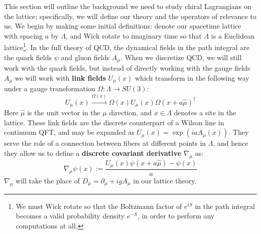 \documentclass[11pt, oneside]{article}   	%
\theoremstyle{definition}
\begin{document}
This section will outline the background we need to study chiral Lagrangians on the lattice; specifically, we will define our 
theory and the operators of relevance to us. We begin by making some initial definitions: denote our spacetime lattice with 
spacing $a$ by $\Lambda$, and Wick rotate to imaginary time so that $\Lambda$ is a Euclidean lattice\footnote{We must 
Wick rotate so that the Boltzmann factor of $e^{iS}$ in the path integral becomes a valid probability density $e^{-S}$, in 
order to perform any computations at all.}. In the full theory of QCD, the dynamical fields in the path integral are the quark 
fields $\psi$ and gluon fields $A_\mu$. When we discretize QCD, we will still work with the quark fields, but instead of 
directly working with the gauge fields $A_\mu$ we will work with \textbf{link fields} $U_\mu(x)$ which transform in the 
following way under a gauge transformation $\Omega : \Lambda\rightarrow SU(3)$:
\begin{equation}
	U_\mu(x)\xrightarrow{\Omega(x)}\Omega(x) U_\mu(x)\Omega(x + a\hat{\mu})^\dagger
\end{equation}
Here $\hat{\mu}$ is the unit vector in the $\mu$ direction, and $x\in\Lambda$ denotes a site in the lattice. These link fields 
are the discrete counterpart of a Wilson line in continuum QFT, and may be expanded as $U_\mu(x) = \exp(ia A_\mu(x))$. 
They serve the role of a connection between fibers at different points in $\Lambda$, and hence they allow us to define a 
\textbf{discrete covariant derivative} $\nabla_\mu$ as:
\begin{equation}
	\nabla_\mu\psi(x) := \frac{U_\mu(x)\psi(x + a\hat{\mu}) - \psi(x)}{a}
\end{equation}
$\nabla_\mu$ will take the place of $D_\mu = \partial_\mu + ig A_\mu$ in our lattice theory. 
\end{document}
